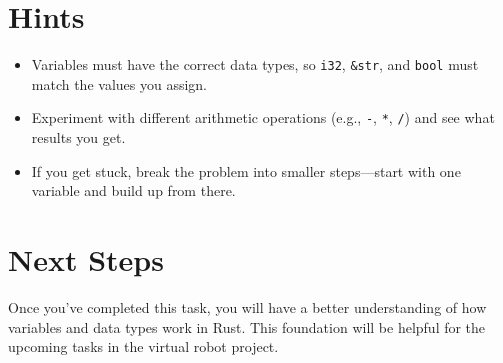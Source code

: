 \documentclass[12pt]{article}
\begin{document}
	\section*{Hints}
	\begin{itemize}
		\item Variables must have the correct data types, so \texttt{i32}, \texttt{\&str}, and \texttt{bool} must match the values you assign.
		\item Experiment with different arithmetic operations (e.g., \texttt{-}, \texttt{*}, \texttt{/}) and see what results you get.
		\item If you get stuck, break the problem into smaller steps—start with one variable and build up from there.
	\end{itemize}
	
	\section*{Next Steps}
	Once you’ve completed this task, you will have a better understanding of how variables and data types work in Rust. This foundation will be helpful for the upcoming tasks in the virtual robot project.
	
\end{document}
